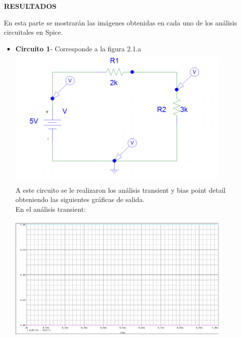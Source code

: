 \documentclass[12pt]{article}
\begin{document}
	\newpage
	
	\begin{center}
		\textbf{\large RESULTADOS}\\
	\end{center}
	

	En esta parte se mostrarán las imágenes obtenidas en cada uno de los análisis circuitales en Spice.\\
	
	\begin{itemize}
		\item \textbf{Circuito 1}- Corresponde a la figura 2.1.a\\ 
		
		\includegraphics[width=11cm,height=7cm]{dc_dos_resis}\\
		
		\noindent A este circuito se le realizaron los análisis transient y bias point detail obteniendo las siguientes gráficas de salida.\\
		
		\noindent En el análisis transient:\\
		
		\includegraphics[width=11cm,height=7cm]{Fuente_DC_y_dos_resistencias}
		

\end{itemize}
\end{document}
